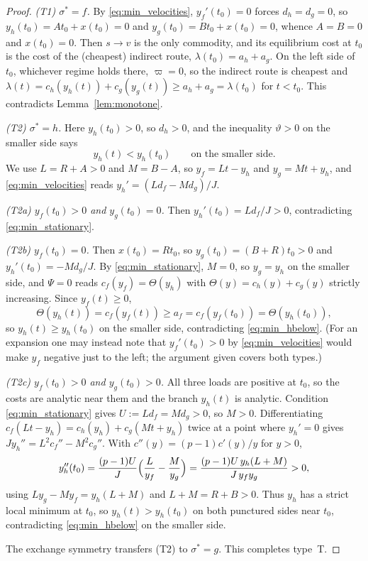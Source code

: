 \begin{proof}
\smallskip\noindent
\emph{(T1) $\sigma^*=f$.} By \eqref{eq:min_velocities},
$y_f'(t_0)=0$ forces $d_h=d_g=0$, so $y_h(t_0)=At_0+x(t_0)=0$ and
$y_g(t_0)=Bt_0+x(t_0)=0$, whence $A=B=0$ and $x(t_0)=0$. Then $s\to v$ is the
only commodity, and its equilibrium cost at $t_0$ is the cost of the
(cheapest) indirect route, $\lambda(t_0)=a_h+a_g$. On the left side of $t_0$,
whichever regime holds there, $\varpi=0$, so the indirect route is cheapest
and $\lambda(t)=c_h(y_h(t))+c_g(y_g(t))\ge a_h+a_g=\lambda(t_0)$ for $t<t_0$.
This contradicts Lemma~\ref{lem:monotone}.

\smallskip\noindent
\emph{(T2) $\sigma^*=h$.} Here $y_h(t_0)>0$, so $d_h>0$, and the
inequality $\vartheta>0$ on the smaller side says
\begin{equation}\label{eq:min_hbelow}
 y_h(t)<y_h(t_0)\qquad\text{on the smaller side.}
\end{equation}
We use $L=R+A>0$ and $M=B-A$, so $y_f=Lt-y_h$ and $y_g=Mt+y_h$, and
\eqref{eq:min_velocities} reads $y_h'=(Ld_f-Md_g)/J$.

\emph{(T2a) $y_f(t_0)>0$ and $y_g(t_0)=0$.} Then $y_h'(t_0)=Ld_f/J>0$,
contradicting \eqref{eq:min_stationary}.

\emph{(T2b) $y_f(t_0)=0$.} Then $x(t_0)=Rt_0$, so $y_g(t_0)=(B+R)t_0>0$ and
$y_h'(t_0)=-Md_g/J$. By \eqref{eq:min_stationary}, $M=0$, so $y_g=y_h$ on the
smaller side, and $\Psi=0$ reads $c_f(y_f)=\Theta(y_h)$ with
$\Theta(y)=c_h(y)+c_g(y)$ strictly increasing. Since $y_f(t)\ge0$,
\[
 \Theta(y_h(t))=c_f(y_f(t))\ge a_f=c_f(y_f(t_0))=\Theta(y_h(t_0)),
\]
so $y_h(t)\ge y_h(t_0)$ on the smaller side, contradicting
\eqref{eq:min_hbelow}. (For an expansion one may instead note that
$y_f'(t_0)>0$ by \eqref{eq:min_velocities} would make $y_f$ negative just to
the left; the argument given covers both types.)

\emph{(T2c) $y_f(t_0)>0$ and $y_g(t_0)>0$.} All three loads are positive at
$t_0$, so the costs are analytic near them and the branch $y_h(t)$ is
analytic. Condition \eqref{eq:min_stationary} gives $U:=Ld_f=Md_g>0$, so
$M>0$. Differentiating $c_f(Lt-y_h)=c_h(y_h)+c_g(Mt+y_h)$ twice at a point where
$y_h'=0$ gives $Jy_h''=L^2c_f''-M^2c_g''$. With
$c''(y)=(p-1)c'(y)/y$ for $y>0$,
\[
 y_h''(t_0)=\frac{(p-1)U}J\Bigl(\frac L{y_f}-\frac M{y_g}\Bigr)
 =\frac{(p-1)U\,y_h(L+M)}{J\,y_fy_g}>0,
\]
using $Ly_g-My_f=y_h(L+M)$ and $L+M=R+B>0$. Thus $y_h$ has a strict local
minimum at $t_0$, so $y_h(t)>y_h(t_0)$ on both punctured sides near $t_0$,
contradicting \eqref{eq:min_hbelow} on the smaller side.

The exchange symmetry transfers (T2) to $\sigma^*=g$. This completes type~T.
\end{proof}


